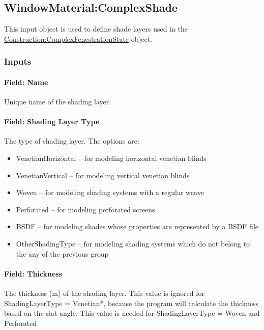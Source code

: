 \subsection{WindowMaterial:ComplexShade}\label{windowmaterialcomplexshade}

This input object is used to define shade layers used in the \hyperref[constructioncomplexfenestrationstate]{Construction:ComplexFenestrationState} object.

\subsubsection{Inputs}\label{inputs-24-003}

\paragraph{Field: Name}\label{field-name-18-007}

Unique name of the shading layer.

\paragraph{Field: Shading Layer Type}\label{field-shading-layer-type}

The type of shading layer. The options are:

\begin{itemize}
\item
  VenetianHorizontal -- for modeling horizontal venetian blinds
\item
  VenetianVertical -- for modeling vertical venetian blinds
\item
  Woven -- for modeling shading systems with a regular weave
\item
  Perforated -- for modeling perforated screens
\item
  BSDF -- for modeling shades whose properties are represented by a BSDF file
\item
  OtherShadingType -- for modeling shading systems which do not belong to the any of the previous group
\end{itemize}

\paragraph{Field: Thickness}\label{field-thickness-7}

The thickness (m) of the shading layer. This value is ignored for ShadingLayerType = Venetian*, because the program will calculate the thickness based on the slat angle. This value is needed for ShadingLayerType = Woven and Perforated

